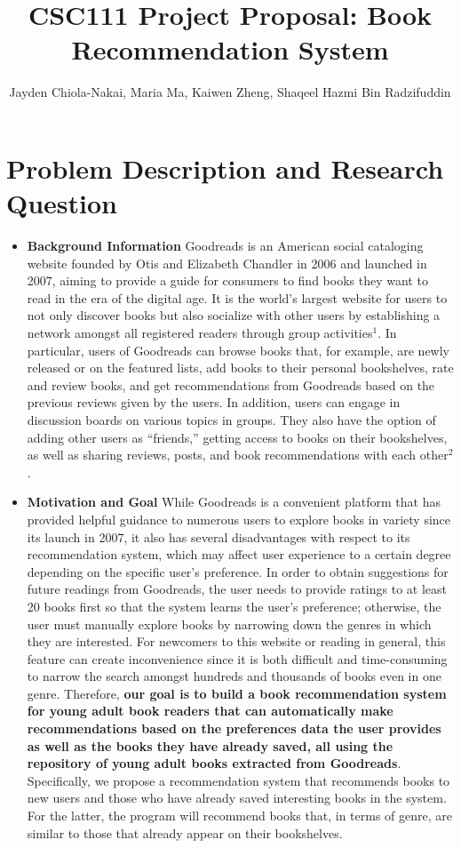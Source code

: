 \documentclass[fontsize=11pt]{article}
\title{CSC111 Project Proposal: Book Recommendation System}
\author{Jayden Chiola-Nakai, Maria Ma, Kaiwen Zheng, Shaqeel Hazmi Bin Radzifuddin}
\begin{document}
\maketitle

\section*{Problem Description and Research Question}

\begin{itemize}
\item \textbf{Background Information }Goodreads is an American social cataloging website founded by Otis and Elizabeth Chandler in 2006 and launched in 2007, aiming to provide a guide for consumers to find books they want to read in the era of the digital age. It is the world’s largest website for users to not only discover books but also socialize with other users by establishing a network amongst all registered readers through group activities$^1$. In particular, users of Goodreads can browse books that, for example, are newly released or on the featured lists, add books to their personal bookshelves, rate and review books, and get recommendations from Goodreads based on the previous reviews given by the users. In addition, users can engage in discussion boards on various topics in groups. They also have the option of adding other users as “friends,” getting access to books on their bookshelves, as well as sharing reviews, posts, and book recommendations with each other$^2$. 

\item \textbf{Motivation and Goal }While Goodreads is a convenient platform that has provided helpful guidance to numerous users to explore books in variety since its launch in 2007, it also has several disadvantages with respect to its recommendation system, which may affect user experience to a certain degree depending on the specific user’s preference. In order to obtain suggestions for future readings from Goodreads, the user needs to provide ratings to at least 20 books first so that the system learns the user’s preference; otherwise, the user must manually explore books by narrowing down the genres in which they are interested. For newcomers to this website or reading in general, this feature can create inconvenience since it is both difficult and time-consuming to narrow the search amongst hundreds and thousands of books even in one genre. Therefore, \textbf{our goal is to build a book recommendation system for young adult book readers that can automatically make recommendations based on the preferences data the user provides as well as the books they have already saved, all using the repository of young adult books extracted from Goodreads}. Specifically, we propose a recommendation system that recommends books to new users and those who have already saved interesting books in the system. For the latter, the program will recommend books that, in terms of genre, are similar to those that already appear on their bookshelves.
\end{itemize}
\end{document}
